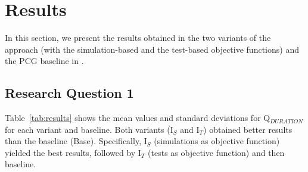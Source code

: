\section{Results}
\label{sec:Results}

In this section, we present the results obtained in the two variants of the \ApproachName{} approach (with the simulation-based and the test-based objective functions) and the PCG baseline in \CaseStudy{}.

\subsection{Research Question 1}

Table~\ref{tab:results} shows the mean values and standard deviations for Q$_{DURATION}$ for each variant and baseline. Both variants (I$_S$ and I$_T$) obtained better results than the baseline (Base). Specifically, I$_S$ (simulations as objective function) yielded the best results, followed by I$_T$ (tests as objective function) and then baseline.

